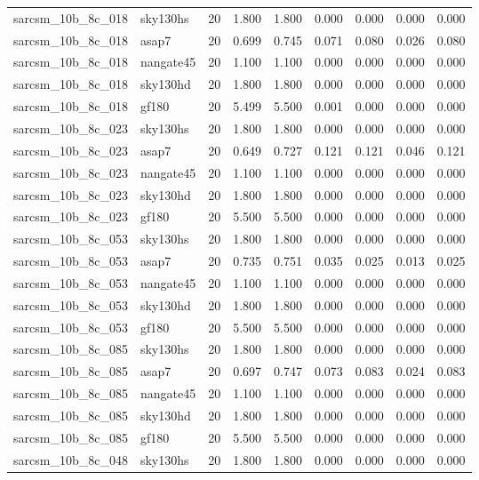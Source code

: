 \begin{tabular}{llrrrrrrr}
sarcsm\_10b\_8c\_018 & sky130hs & 20 & 1.800 & 1.800 & 0.000 & 0.000 & 0.000 & 0.000 \\
sarcsm\_10b\_8c\_018 & asap7 & 20 & 0.699 & 0.745 & 0.071 & 0.080 & 0.026 & 0.080 \\
sarcsm\_10b\_8c\_018 & nangate45 & 20 & 1.100 & 1.100 & 0.000 & 0.000 & 0.000 & 0.000 \\
sarcsm\_10b\_8c\_018 & sky130hd & 20 & 1.800 & 1.800 & 0.000 & 0.000 & 0.000 & 0.000 \\
sarcsm\_10b\_8c\_018 & gf180 & 20 & 5.499 & 5.500 & 0.001 & 0.000 & 0.000 & 0.000 \\
sarcsm\_10b\_8c\_023 & sky130hs & 20 & 1.800 & 1.800 & 0.000 & 0.000 & 0.000 & 0.000 \\
sarcsm\_10b\_8c\_023 & asap7 & 20 & 0.649 & 0.727 & 0.121 & 0.121 & 0.046 & 0.121 \\
sarcsm\_10b\_8c\_023 & nangate45 & 20 & 1.100 & 1.100 & 0.000 & 0.000 & 0.000 & 0.000 \\
sarcsm\_10b\_8c\_023 & sky130hd & 20 & 1.800 & 1.800 & 0.000 & 0.000 & 0.000 & 0.000 \\
sarcsm\_10b\_8c\_023 & gf180 & 20 & 5.500 & 5.500 & 0.000 & 0.000 & 0.000 & 0.000 \\
sarcsm\_10b\_8c\_053 & sky130hs & 20 & 1.800 & 1.800 & 0.000 & 0.000 & 0.000 & 0.000 \\
sarcsm\_10b\_8c\_053 & asap7 & 20 & 0.735 & 0.751 & 0.035 & 0.025 & 0.013 & 0.025 \\
sarcsm\_10b\_8c\_053 & nangate45 & 20 & 1.100 & 1.100 & 0.000 & 0.000 & 0.000 & 0.000 \\
sarcsm\_10b\_8c\_053 & sky130hd & 20 & 1.800 & 1.800 & 0.000 & 0.000 & 0.000 & 0.000 \\
sarcsm\_10b\_8c\_053 & gf180 & 20 & 5.500 & 5.500 & 0.000 & 0.000 & 0.000 & 0.000 \\
sarcsm\_10b\_8c\_085 & sky130hs & 20 & 1.800 & 1.800 & 0.000 & 0.000 & 0.000 & 0.000 \\
sarcsm\_10b\_8c\_085 & asap7 & 20 & 0.697 & 0.747 & 0.073 & 0.083 & 0.024 & 0.083 \\
sarcsm\_10b\_8c\_085 & nangate45 & 20 & 1.100 & 1.100 & 0.000 & 0.000 & 0.000 & 0.000 \\
sarcsm\_10b\_8c\_085 & sky130hd & 20 & 1.800 & 1.800 & 0.000 & 0.000 & 0.000 & 0.000 \\
sarcsm\_10b\_8c\_085 & gf180 & 20 & 5.500 & 5.500 & 0.000 & 0.000 & 0.000 & 0.000 \\
sarcsm\_10b\_8c\_048 & sky130hs & 20 & 1.800 & 1.800 & 0.000 & 0.000 & 0.000 & 0.000 \\

\end{tabular}
